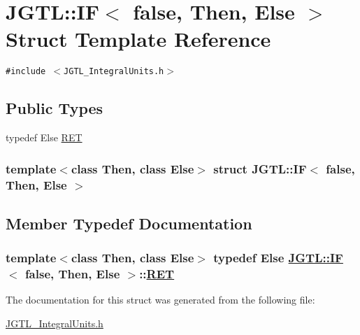 \hypertarget{struct_j_g_t_l_1_1_i_f_3_01false_00_01_then_00_01_else_01_4}{
\section{JGTL::IF$<$ false, Then, Else $>$ Struct Template Reference}
\label{struct_j_g_t_l_1_1_i_f_3_01false_00_01_then_00_01_else_01_4}
}
{\tt \#include $<$JGTL\_\-Integral\-Units.h$>$}

\subsection*{Public Types}
\begin{CompactItemize}
\item 
typedef Else \hyperlink{struct_j_g_t_l_1_1_i_f_3_01false_00_01_then_00_01_else_01_4_471d3ff51488c1d43504d3eb98bd6f2b}{RET}
\end{CompactItemize}
\subsubsection*{template$<$class Then, class Else$>$ struct JGTL::IF$<$ false, Then, Else $>$}



\subsection{Member Typedef Documentation}
\hypertarget{struct_j_g_t_l_1_1_i_f_3_01false_00_01_then_00_01_else_01_4_471d3ff51488c1d43504d3eb98bd6f2b}{
\subsubsection[RET]{\setlength{\rightskip}{0pt plus 5cm}template$<$class Then, class Else$>$ typedef Else \hyperlink{struct_j_g_t_l_1_1_i_f}{JGTL::IF}$<$ false, Then, Else $>$::\hyperlink{struct_j_g_t_l_1_1_i_f_3_01false_00_01_then_00_01_else_01_4_471d3ff51488c1d43504d3eb98bd6f2b}{RET}}}
\label{struct_j_g_t_l_1_1_i_f_3_01false_00_01_then_00_01_else_01_4_471d3ff51488c1d43504d3eb98bd6f2b}




The documentation for this struct was generated from the following file:\begin{CompactItemize}
\item 
\hyperlink{_j_g_t_l___integral_units_8h}{JGTL\_\-Integral\-Units.h}\end{CompactItemize}
